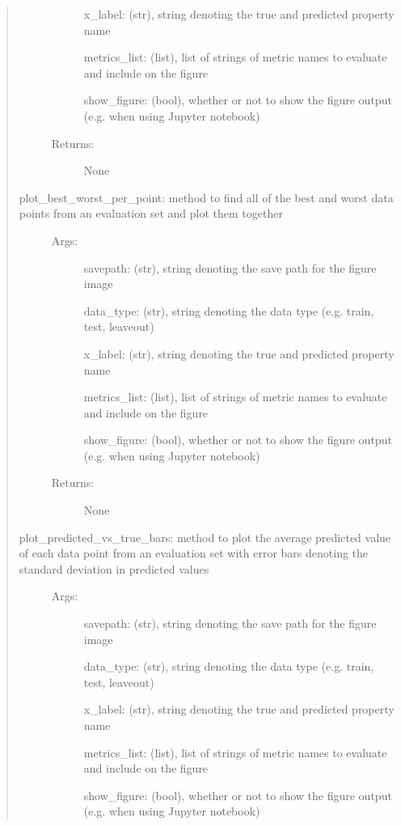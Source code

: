 \documentclass[letterpaper,10pt,english]{sphinxmanual}
\begin{document}
\begin{fulllineitems}
\begin{quote}
\begin{description}
\begin{description}
x\_label: (str), string denoting the true and predicted property name

metrics\_list: (list), list of strings of metric names to evaluate and include on the figure

show\_figure: (bool), whether or not to show the figure output (e.g. when using Jupyter notebook)

\item[{Returns:}] \leavevmode
None

\end{description}

\item[{plot\_best\_worst\_per\_point: method to find all of the best and worst data points from an evaluation set and plot them together}] \leavevmode\begin{description}
\item[{Args:}] \leavevmode
savepath: (str), string denoting the save path for the figure image

data\_type: (str), string denoting the data type (e.g. train, test, leaveout)

x\_label: (str), string denoting the true and predicted property name

metrics\_list: (list), list of strings of metric names to evaluate and include on the figure

show\_figure: (bool), whether or not to show the figure output (e.g. when using Jupyter notebook)

\item[{Returns:}] \leavevmode
None

\end{description}

\item[{plot\_predicted\_vs\_true\_bars: method to plot the average predicted value of each data point from an evaluation set with error bars denoting the standard deviation in predicted values}] \leavevmode\begin{description}
\item[{Args:}] \leavevmode
savepath: (str), string denoting the save path for the figure image

data\_type: (str), string denoting the data type (e.g. train, test, leaveout)

x\_label: (str), string denoting the true and predicted property name

metrics\_list: (list), list of strings of metric names to evaluate and include on the figure

show\_figure: (bool), whether or not to show the figure output (e.g. when using Jupyter notebook)


\end{description}
\end{description}
\end{quote}
\end{fulllineitems}
\end{document}
